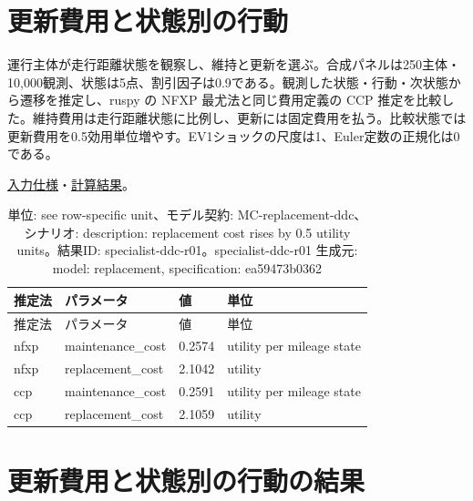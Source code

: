 \documentclass[ecta,nameyear,draft]{econsocart}
\begin{document}
\begin{minipage}{\linewidth}

\section{更新費用と状態別の行動}\label{result-11}

運行主体が走行距離状態を観察し、維持と更新を選ぶ。合成パネルは250主体・10,000観測、状態は5点、割引因子は0.9である。観測した状態・行動・次状態から遷移を推定し、ruspy
の NFXP 最尤法と同じ費用定義の CCP
推定を比較した。維持費用は走行距離状態に比例し、更新には固定費用を払う。比較状態では更新費用を0.5効用単位増やす。EV1ショックの尺度は1、Euler定数の正規化は0である。

\href{https://github.com/yoshimurahiroki/econ-project-mini/blob/f9093ba87cabce7bee1fdf3391656544617a8cb9/examples/research-workspace/models/replacement-spec.json}{入力仕様}・\href{https://github.com/yoshimurahiroki/econ-project-mini/blob/f9093ba87cabce7bee1fdf3391656544617a8cb9/examples/research-workspace/models/replacement-result.json}{計算結果}。

\begin{longtable}[]{@{}llll@{}}
\caption{単位: see row-specific unit、モデル契約:
MC-replacement-ddc、シナリオ: description: replacement cost rises by 0.5
utility units。結果ID: specialist-ddc-r01。specialist-ddc-r01 生成元:
model: replacement, specification: ea59473b0362}\tabularnewline
\toprule\noalign{}
推定法 & パラメータ & 値 & 単位 \\
\midrule\noalign{}
\endfirsthead
\toprule\noalign{}
推定法 & パラメータ & 値 & 単位 \\
\midrule\noalign{}
\endhead
\bottomrule\noalign{}
\endlastfoot
nfxp & maintenance\_cost & 0.2574 & utility per mileage state \\
nfxp & replacement\_cost & 2.1042 & utility \\
ccp & maintenance\_cost & 0.2591 & utility per mileage state \\
ccp & replacement\_cost & 2.1059 & utility \\
\end{longtable}

\end{minipage}

\section{更新費用と状態別の行動の結果}\label{result-12}
\end{document}
